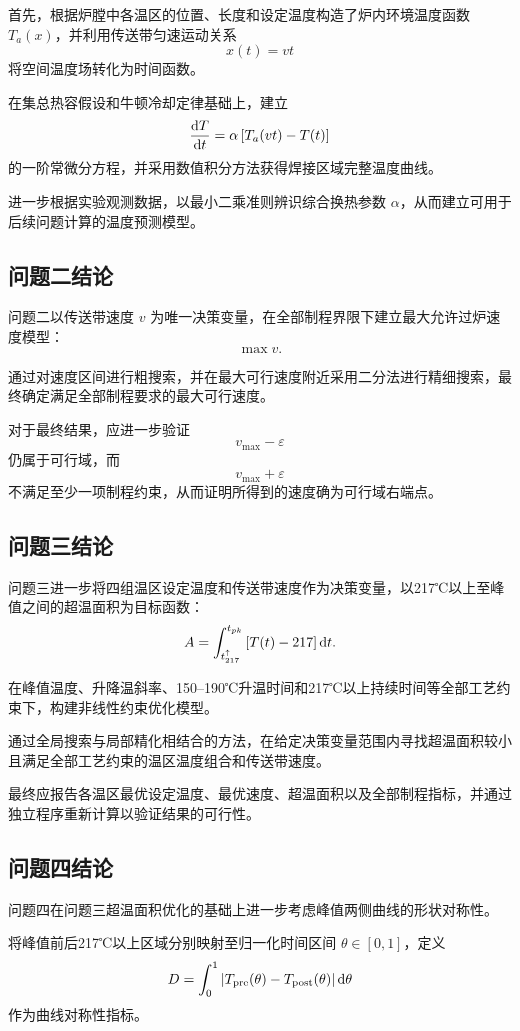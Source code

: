 \documentclass{cumcmthesis}
\begin{document}
首先，根据炉膛中各温区的位置、长度和设定温度构造了炉内环境温度函数 $T_a(x)$，并利用传送带匀速运动关系
\[
x(t)=vt
\]
将空间温度场转化为时间函数。

在集总热容假设和牛顿冷却定律基础上，建立
\[
\frac{{\rm d}T}{{\rm d}t}
=
\alpha
\left[
T_a(vt)-T(t)
\right]
\]
的一阶常微分方程，并采用数值积分方法获得焊接区域完整温度曲线。

进一步根据实验观测数据，以最小二乘准则辨识综合换热参数 $\alpha$，从而建立可用于后续问题计算的温度预测模型。

\subsection{问题二结论}

问题二以传送带速度 $v$ 为唯一决策变量，在全部制程界限下建立最大允许过炉速度模型：
\[
\max v.
\]

通过对速度区间进行粗搜索，并在最大可行速度附近采用二分法进行精细搜索，最终确定满足全部制程要求的最大可行速度。

对于最终结果，应进一步验证
\[
v_{\max}-\varepsilon
\]
仍属于可行域，而
\[
v_{\max}+\varepsilon
\]
不满足至少一项制程约束，从而证明所得到的速度确为可行域右端点。

\subsection{问题三结论}

问题三进一步将四组温区设定温度和传送带速度作为决策变量，以217℃以上至峰值之间的超温面积为目标函数：
\[
A
=
\int_{t_{217}^{\uparrow}}^{t_{pk}}
\left[T(t)-217\right]{\rm d}t.
\]

在峰值温度、升降温斜率、150--190℃升温时间和217℃以上持续时间等全部工艺约束下，构建非线性约束优化模型。

通过全局搜索与局部精化相结合的方法，在给定决策变量范围内寻找超温面积较小且满足全部工艺约束的温区温度组合和传送带速度。

最终应报告各温区最优设定温度、最优速度、超温面积以及全部制程指标，并通过独立程序重新计算以验证结果的可行性。

\subsection{问题四结论}

问题四在问题三超温面积优化的基础上进一步考虑峰值两侧曲线的形状对称性。

将峰值前后217℃以上区域分别映射至归一化时间区间 $\theta\in[0,1]$，定义
\[
D
=
\int_0^1
\left|
T_{\rm pre}(\theta)
-
T_{\rm post}(\theta)
\right|
{\rm d}\theta
\]
作为曲线对称性指标。
\end{document}
